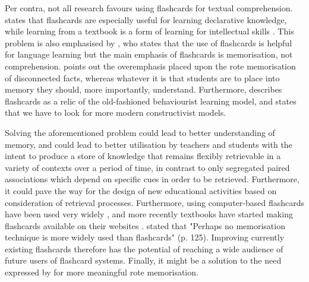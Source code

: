 
Per contra, not all research favours using flashcards for textual comprehension.  states that flashcards are especially useful for learning declarative knowledge, while learning from a textbook is a form of learning for intellectual skills \cite{instructionaldesign}. This problem is also emphasised by , who states that the use of flashcards is helpful for language learning but the main emphasis of flashcards is memorisation, not comprehension.  points out the overemphasis placed upon the rote memorisation of disconnected facts, whereas whatever it is that students are to place into memory they should, more importantly, understand. Furthermore,  describes flashcards as a relic of the old-fashioned behaviourist learning model, and states that we have to look for more modern constructivist models.


Solving the aforementioned problem could lead to better understanding of memory, and could lead to better utilisation by teachers and students with the intent to produce a store of knowledge that remains flexibly retrievable in a variety of contexts over a period of time, in contrast to only segregated paired associations which depend on specific cues in order to be retrieved. Furthermore, it could pave the way for the design of new educational activities based on consideration of retrieval processes. Furthermore, using computer-based flashcards have been used very widely \cite{nakata}, and more recently textbooks have started making flashcards available on their websites \cite{burgess, golding}.  stated that "Perhaps no memorisation technique is more widely used than flashcards" (p. 125). Improving currently existing flashcards therefore has the potential of reaching a wide audience of future users of flashcard systems. Finally, it might be a solution to the need expressed by  for more meaningful rote memorisation.



